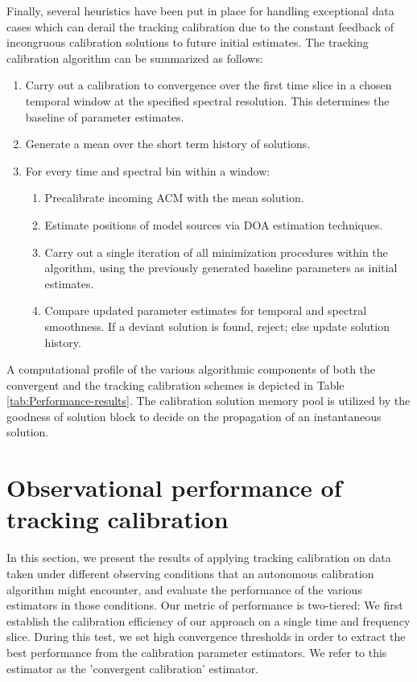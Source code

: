 \documentclass{aa}
\begin{document}
Finally, several heuristics have been put in place for handling exceptional data
cases which can derail the tracking  calibration due to the constant feedback of
incongruous  calibration solutions  to future  initial estimates.   The tracking
calibration algorithm can be summarized as follows:
\begin{enumerate}
\item Carry  out a  calibration to convergence  over the  first time slice  in a
  chosen temporal  window at the specified spectral  resolution. This determines
  the baseline of parameter estimates.
\item Generate a mean over the short term history of solutions.
\item For every time and spectral bin within a window:
  \begin{enumerate}
    \item Precalibrate incoming ACM with the mean solution.
    \item Estimate positions of model sources via DOA estimation techniques.
    \item Carry out a single iteration of all minimization procedures within the
      algorithm, using  the previously generated baseline  parameters as initial
      estimates.
    \item  Compare  updated  parameter   estimates  for  temporal  and  spectral
      smoothness.  If a deviant solution  is found, reject; else update solution
      history.
  \end{enumerate}
\end{enumerate}

A  computational profile  of  the  various algorithmic  components  of both  the
convergent  and   the  tracking  calibration   schemes  is  depicted   in  Table
\ref{tab:Performance-results}.  The calibration solution memory pool is utilized
by  the  goodness  of  solution  block  to  decide  on  the  propagation  of  an
instantaneous solution.

\section{\label{sec:Performance-of-tracking}Observational performance of tracking calibration}


In this section, we present the results of applying tracking calibration on data
taken  under  different  observing  conditions that  an  autonomous  calibration
algorithm  might  encounter,  and   evaluate  the  performance  of  the  various
estimators in  those conditions.   Our metric of  performance is  two-tiered: We
first establish the calibration efficiency of  our approach on a single time and
frequency slice. During  this test, we set high  convergence thresholds in order
to extract the  best performance from the calibration  parameter estimators.  We
refer to this estimator as the 'convergent calibration' estimator.
\end{document}
